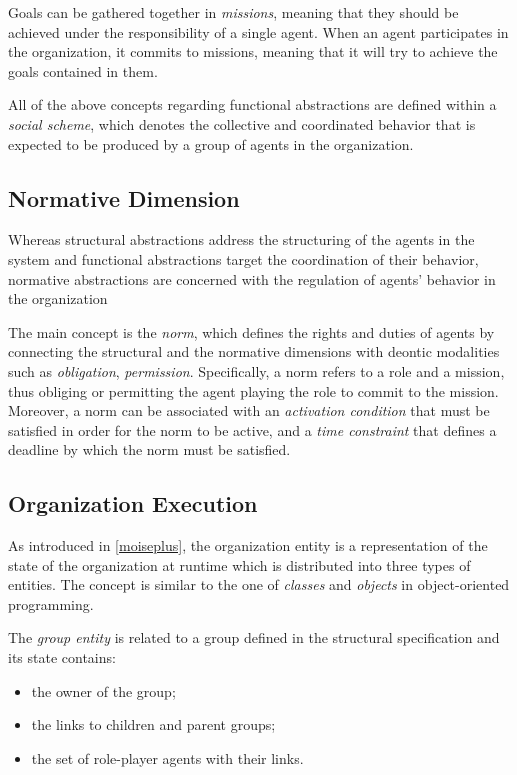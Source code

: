 Goals can be gathered together in \textit{missions}, meaning that they should be achieved under the responsibility of a single agent.
When an agent participates in the organization, it commits to missions, meaning that it will try to achieve the goals contained in them.

All of the above concepts regarding functional abstractions are defined within a \textit{social scheme}, which denotes the collective and coordinated behavior that is expected to be produced by a group of agents in the organization.

\subsection{Normative Dimension}
Whereas structural abstractions address the structuring of the agents in the system and functional abstractions target the coordination of their behavior, normative abstractions are concerned with the regulation of agents' behavior in the organization

The main concept is the \textit{norm}, which defines the rights and duties of agents by connecting the structural and the normative dimensions with deontic modalities such as \textit{obligation}, \textit{permission}.
Specifically, a norm refers to a role and a mission, thus obliging or permitting the agent playing the role to commit to the mission.
Moreover, a norm can be associated with an \textit{activation condition} that must be satisfied in order for the norm to be active, and a \textit{time constraint} that defines a deadline by which the norm must be satisfied.

\subsection{Organization Execution}
As introduced in \cref{moiseplus}, the organization entity is a representation of the state of the organization at runtime which is distributed into three types of entities.
The concept is similar to the one of \textit{classes} and \textit{objects} in object-oriented programming.

The \textit{group entity} is related to a group defined in the structural specification and its state contains:
\begin{itemize}
    \item the owner of the group;
    \item the links to children and parent groups;
    \item the set of role-player agents with their links.
\end{itemize}

